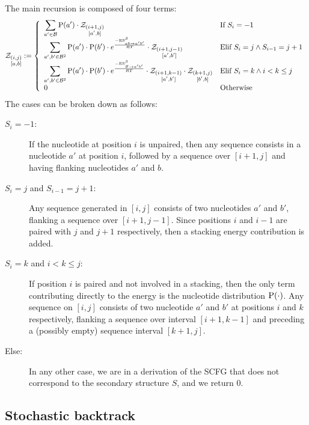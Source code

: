 The main recursion is composed of four terms:
\begin{equation}
	\Z{i,j}{a,b}:=\left\{
  \begin{array}{ll}
  		\displaystyle
      \sum_{a'\in \B}  
      \Prob(a')
      \cdot\Z{i+1,j}{a',b} & \text{If }S_{i}=-1\\
      \displaystyle
      \sum_{a',b'\in \B^2}
			 \Prob(a')
			 \cdot\Prob(b')
			 \cdot e^{\frac{-\ES^{\beta}_{ab \to a'b'}}{RT}}
			 \cdot \Z{i+1,j-1}{a',b'}&
			 \text{Elif }S_i=j \land S_{i-1}=j+1\\
			 \displaystyle
      \sum_{a',b'\in \B^2}
      \Prob(a')
			\cdot\Prob(b')
			\cdot e^{\frac{-\ES^{\beta}_{\varnothing\to a'b'}}{RT}}
      \cdot\Z{i+1,k-1}{a',b'}
      \cdot\Z{k+1,j}{b',b} & \text{Elif }S_i=k \land i < k \leq j\\
      0 &\text{Otherwise}
	\end{array}\right.
\label{eq:Z_rec}
\end{equation}
The cases can be broken down as follows:
\begin{description}
\item[$S_{i}=-1$:] If the nucleotide at position $i$ is unpaired, then 
any sequence consists in a nucleotide $a'$ at position  $i$, 
followed by a sequence over $[i+1,j]$ and having flanking nucleotides $a'$ and $b$.
\item[$S_i=j$ and $S_{i-1}=j+1$:] Any sequence generated in $[i,j]$ consists of two nucleotides $a'$ and $b'$, flanking a sequence over $[i+1,j-1]$.
Since positions $i$ and $i-1$ are paired with $j$ and $j+1$ respectively, 
then a stacking energy contribution is added. 
\item[$S_i=k$ and $i<k \leq j$:] If position $i$ is paired and not involved in a stacking, then the 
only term contributing directly to the energy is the nucleotide distribution $\text{P}(\cdot)$. 
Any sequence on $[i,j]$ consists of two nucleotide $a'$ and $b'$ at positions $i$ and $k$ respectively, flanking a sequence over interval $[i+1,k-1]$ and preceding a (possibly empty) sequence interval $[k+1,j]$.
\item[Else:] In any other case, we are in a derivation of the SCFG that does not correspond to the secondary structure $S$, and we return $0$.
\end{description}


\subsection{Stochastic backtrack}

